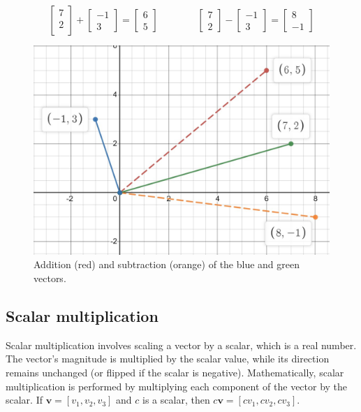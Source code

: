 \documentclass[
	11pt, %
	fleqn, %
	a4paper, %
]{LegrandOrangeBook}
\begin{document}
$$
	\begin{bmatrix}
		7 \\
		2 \\
	\end{bmatrix} + \begin{bmatrix} -1 \\ 3 \end{bmatrix} = \begin{bmatrix} 6 \\ 5 \end{bmatrix} \quad\quad\quad\quad \begin{bmatrix} 7\\2\end{bmatrix} - \begin{bmatrix} -1 \\ 3 \end{bmatrix} = \begin{bmatrix} 8 \\ -1 \end{bmatrix}
$$

\begin{figure}[h]
	\caption{Addition (red) and subtraction (orange) of the blue and green vectors.}
	\centering
	\includegraphics[scale = 0.55]{Images/add_sub_plot.jpg}
\end{figure}

\subsection{Scalar multiplication}

Scalar multiplication involves scaling a vector by a scalar, which is a real number. The vector's magnitude is multiplied by the scalar value,
while its direction remains unchanged (or flipped if the scalar is negative). Mathematically, scalar multiplication is performed by multiplying each component of the vector by the scalar. If $\textbf{v} = [v_{1}, v_{2}, v_{3}]$
and $c$ is a scalar, then $c\textbf{v} = [cv_{1}, cv_{2}, cv_{3}]$.
\end{document}
